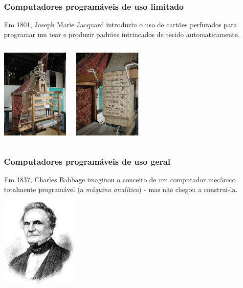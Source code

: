 \documentclass[hyperref={pdfpagelabels=false}]{beamer}
\begin{document}
\begin{frame}
   \frametitle{Computadores programáveis de uso limitado}
   Em 1801, Joseph Marie Jacquard introduziu o uso de cartões perfurados para programar um tear e produzir padrões intrincados de tecido automaticamente.
   \vspace{0.4cm}
   \begin{center}
   \begin{columns}
      \column{5cm}
			\begin{center}
			\includegraphics[height=4.5cm]{img/jacquard.jpg}
			\end{center}
      \column{5cm}
			\begin{center}
			\includegraphics[height=4.5cm]{img/jacquard_cartao.jpg}
			\end{center}
   \end{columns}
   \end{center}
\end{frame}
\begin{frame}
   \frametitle{Computadores programáveis de uso geral}
   Em 1837, Charles Babbage imaginou o conceito de um computador mecânico totalmente programável (a \emph{máquina analítica}) - mas não chegou a construi-la.
   	\begin{center}
		   \includegraphics[height=4.5cm]{img/CharlesBabbage.jpg}
		\end{center}
\end{frame}
\end{document}
